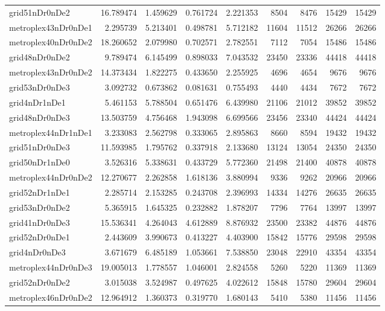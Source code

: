 \begin{longtable}{|l|r|r|r|r|r|r|r|r|}
grid51nDr0nDe2 & 16.789474 & 1.459629 & 0.761724 & 2.221353 & 8504 & 8476 & 15429 & 15429 \\
metroplex43nDr0nDe1 & 2.295739 & 5.213401 & 0.498781 & 5.712182 & 11604 & 11512 & 26266 & 26266 \\
metroplex40nDr0nDe2 & 18.260652 & 2.079980 & 0.702571 & 2.782551 & 7112 & 7054 & 15486 & 15486 \\
grid48nDr0nDe2 & 9.789474 & 6.145499 & 0.898033 & 7.043532 & 23450 & 23336 & 44418 & 44418 \\
metroplex43nDr0nDe2 & 14.373434 & 1.822275 & 0.433650 & 2.255925 & 4696 & 4654 & 9676 & 9676 \\
grid53nDr0nDe3 & 3.092732 & 0.673862 & 0.081631 & 0.755493 & 4440 & 4434 & 7672 & 7672 \\
grid4nDr1nDe1 & 5.461153 & 5.788504 & 0.651476 & 6.439980 & 21106 & 21012 & 39852 & 39852 \\
grid48nDr0nDe3 & 13.503759 & 4.756468 & 1.943098 & 6.699566 & 23456 & 23340 & 44424 & 44424 \\
metroplex44nDr1nDe1 & 3.233083 & 2.562798 & 0.333065 & 2.895863 & 8660 & 8594 & 19432 & 19432 \\
grid51nDr0nDe3 & 11.593985 & 1.795762 & 0.337918 & 2.133680 & 13124 & 13054 & 24350 & 24350 \\
grid50nDr1nDe0 & 3.526316 & 5.338631 & 0.433729 & 5.772360 & 21498 & 21400 & 40878 & 40878 \\
metroplex44nDr0nDe2 & 12.270677 & 2.262858 & 1.618136 & 3.880994 & 9336 & 9262 & 20966 & 20966 \\
grid52nDr1nDe1 & 2.285714 & 2.153285 & 0.243708 & 2.396993 & 14334 & 14276 & 26635 & 26635 \\
grid53nDr0nDe2 & 5.365915 & 1.645325 & 0.232882 & 1.878207 & 7796 & 7764 & 13997 & 13997 \\
grid41nDr0nDe3 & 15.536341 & 4.264043 & 4.612889 & 8.876932 & 23500 & 23382 & 44876 & 44876 \\
grid52nDr0nDe1 & 2.443609 & 3.990673 & 0.413227 & 4.403900 & 15842 & 15776 & 29598 & 29598 \\
grid4nDr0nDe3 & 3.671679 & 6.485189 & 1.053661 & 7.538850 & 23048 & 22910 & 43354 & 43354 \\
metroplex44nDr0nDe3 & 19.005013 & 1.778557 & 1.046001 & 2.824558 & 5260 & 5220 & 11369 & 11369 \\
grid52nDr0nDe2 & 3.015038 & 3.524987 & 0.497625 & 4.022612 & 15848 & 15780 & 29604 & 29604 \\
metroplex46nDr0nDe2 & 12.964912 & 1.360373 & 0.319770 & 1.680143 & 5410 & 5380 & 11456 & 11456 \\

\end{longtable}
